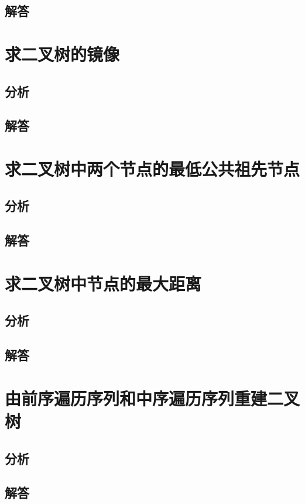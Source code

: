 \documentclass[UTF8,a4paper,12pt]{ctexbook}
\begin{document}
	\subsection{解答}
	
\section{求二叉树的镜像}
	\subsection{分析}
	
	\subsection{解答}
	
\section{求二叉树中两个节点的最低公共祖先节点}
	\subsection{分析}
	
	\subsection{解答}
	
\section{求二叉树中节点的最大距离}
	\subsection{分析}
	
	\subsection{解答}
	
\section{由前序遍历序列和中序遍历序列重建二叉树}
	\subsection{分析}
	
	\subsection{解答}
	
\end{document}
